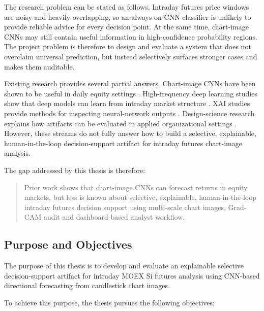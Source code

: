 The research problem can be stated as follows. Intraday futures price windows are noisy and heavily overlapping, so an always-on CNN classifier is unlikely to provide reliable advice for every decision point. At the same time, chart-image CNNs may still contain useful information in high-confidence probability regions. The project problem is therefore to design and evaluate a system that does not overclaim universal prediction, but instead selectively surfaces stronger cases and makes them auditable.

Existing research provides several partial answers. Chart-image CNNs have been shown to be useful in daily equity settings \cite{jiang_reimagining_price_trends}. High-frequency deep learning studies show that deep models can learn from intraday market structure \cite{deeplob,sirignano_cont_universal}. XAI studies provide methods for inspecting neural-network outputs \cite{selvaraju_gradcam,arrieta_xai}. Design-science research explains how artifacts can be evaluated in applied organizational settings \cite{hevner_dsr,peffers_dsrm}. However, these streams do not fully answer how to build a selective, explainable, human-in-the-loop decision-support artifact for intraday futures chart-image analysis.

The gap addressed by this thesis is therefore:

\begin{quote}
Prior work shows that chart-image CNNs can forecast returns in equity markets, but less is known about selective, explainable, human-in-the-loop intraday futures decision support using multi-scale chart images, Grad-CAM audit and dashboard-based analyst workflow.
\end{quote}

\subsection{Purpose and Objectives}
\label{subsec:purpose_objectives}




The purpose of this thesis is to develop and evaluate an explainable selective decision-support artifact for intraday MOEX Si futures analysis using CNN-based directional forecasting from candlestick chart images.

To achieve this purpose, the thesis pursues the following objectives:

